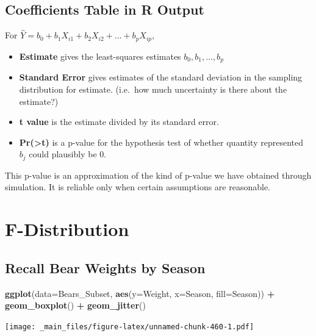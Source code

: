 \documentclass[]{book}
\newenvironment{Shaded}{\begin{snugshade}}{\end{snugshade}}
\newcommand{\KeywordTok}[1]{\textcolor[rgb]{0.13,0.29,0.53}{\textbf{#1}}}
\newcommand{\DataTypeTok}[1]{\textcolor[rgb]{0.13,0.29,0.53}{#1}}
\newcommand{\StringTok}[1]{\textcolor[rgb]{0.31,0.60,0.02}{#1}}
\newcommand{\OperatorTok}[1]{\textcolor[rgb]{0.81,0.36,0.00}{\textbf{#1}}}
\newcommand{\NormalTok}[1]{#1}
\begin{document}
\subsection{Coefficients Table in R
Output}\label{coefficients-table-in-r-output}

For \(\hat{Y} = b_0 + b_1 X_{i1} + b_2X_{i2}+ \ldots + b_pX_{ip}\),

\begin{itemize}
\item
  \textbf{Estimate} gives the least-squares estimates
  \(b_0, b_1, \ldots, b_p\)
\item
  \textbf{Standard Error} gives estimates of the standard deviation in
  the sampling distribution for estimate. (i.e.~how much uncertainty is
  there about the estimate?)
\item
  \textbf{t value} is the estimate divided by its standard error.
\item
  \textbf{Pr(\textgreater{}\textbar{}t\textbar{})} is a p-value for the
  hypothesis test of whether quantity represented \(b_j\) could
  plausibly be 0.
\end{itemize}

This p-value is an approximation of the kind of p-value we have obtained
through simulation. It is reliable only when certain assumptions are
reasonable.

\section{F-Distribution}\label{f-distribution}

\subsection{Recall Bear Weights by
Season}\label{recall-bear-weights-by-season}

\begin{Shaded}
\begin{Highlighting}[]
\KeywordTok{ggplot}\NormalTok{(}\DataTypeTok{data=}\NormalTok{Bears_Subset, }\KeywordTok{aes}\NormalTok{(}\DataTypeTok{y=}\NormalTok{Weight, }\DataTypeTok{x=}\NormalTok{Season, }\DataTypeTok{fill=}\NormalTok{Season)) }\OperatorTok{+}\StringTok{ }
\StringTok{   }\KeywordTok{geom_boxplot}\NormalTok{() }\OperatorTok{+}\StringTok{ }\KeywordTok{geom_jitter}\NormalTok{()}
\end{Highlighting}
\end{Shaded}

\texttt{[image: \_main\_files/figure-latex/unnamed-chunk-460-1.pdf]}
\end{document}
